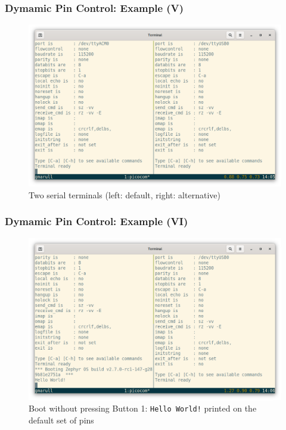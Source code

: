 \documentclass[handout]{beamer}
\begin{document}
\begin{frame}
  \frametitle{Dymamic Pin Control: Example (V)}

  \begin{figure}
    \centering
    \includegraphics[scale=0.2]{terminals-empty.png}
    \caption{Two serial terminals (left: default, right: alternative)}
  \end{figure}
\end{frame}

\begin{frame}
  \frametitle{Dymamic Pin Control: Example (VI)}

  \begin{figure}
    \centering
    \includegraphics[scale=0.2]{terminals-default.png}
    \caption{Boot without pressing Button 1: \texttt{Hello World!} printed on
      the default set of pins}
  \end{figure}
\end{frame}
\end{document}
